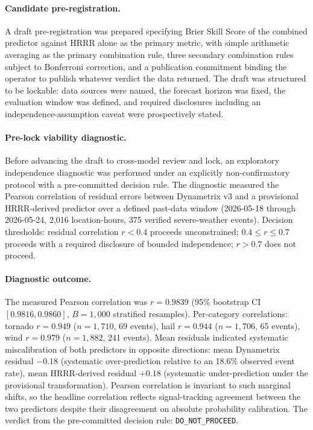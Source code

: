 \documentclass[11pt]{article}
\begin{document}
\paragraph{Candidate pre-registration.}
A draft pre-registration was prepared specifying Brier Skill Score
of the combined predictor against HRRR alone as the primary
metric, with simple arithmetic averaging as the primary
combination rule, three secondary combination rules subject to
Bonferroni correction, and a publication commitment binding the
operator to publish whatever verdict the data returned. The draft
was structured to be lockable: data sources were named, the
forecast horizon was fixed, the evaluation window was defined,
and required disclosures including an independence-assumption
caveat were prospectively stated.

\paragraph{Pre-lock viability diagnostic.}
Before advancing the draft to cross-model review and lock, an
exploratory independence diagnostic was performed under an
explicitly non-confirmatory protocol with a pre-committed decision
rule. The diagnostic measured the Pearson correlation of residual
errors between Dynametrix v3 and a provisional HRRR-derived
predictor over a defined past-data window
(2026-05-18 through 2026-05-24, 2{,}016 location-hours,
375 verified severe-weather events). Decision thresholds: residual
correlation $r < 0.4$ proceeds unconstrained; $0.4 \leq r \leq 0.7$
proceeds with a required disclosure of bounded independence;
$r > 0.7$ does not proceed.

\paragraph{Diagnostic outcome.}
The measured Pearson correlation was $r = 0.9839$ (95\% bootstrap
CI $[0.9816, 0.9860]$, $B = 1{,}000$ stratified resamples). Per-category
correlations: tornado $r = 0.949$ ($n = 1{,}710$, 69 events), hail
$r = 0.944$ ($n = 1{,}706$, 65 events), wind $r = 0.979$
($n = 1{,}882$, 241 events). Mean residuals indicated systematic
miscalibration of both predictors in opposite directions: mean
Dynametrix residual $-0.18$ (systematic over-prediction relative to
an 18.6\% observed event rate), mean HRRR-derived residual $+0.18$
(systematic under-prediction under the provisional transformation).
Pearson correlation is invariant to such marginal shifts, so the
headline correlation reflects signal-tracking agreement between
the two predictors despite their disagreement on absolute
probability calibration. The verdict from the pre-committed
decision rule: \texttt{DO\_NOT\_PROCEED}.
\end{document}
